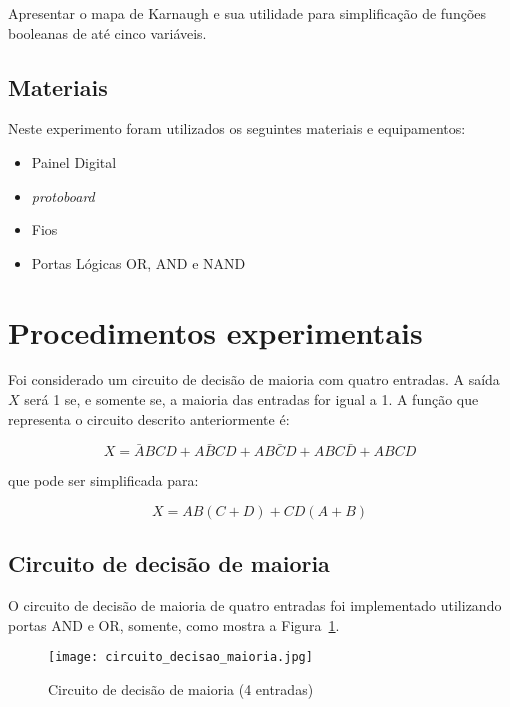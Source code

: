 \documentclass[12pt]{article}
\begin{document}
Apresentar o mapa de Karnaugh e sua utilidade para simplificação de funções booleanas de até cinco variáveis.

\subsection{Materiais} 
\label{sec:Materiais}
Neste experimento foram utilizados os seguintes materiais e equipamentos:
\begin{itemize}
    \item Painel Digital

    \item \textit{protoboard}
    
    \item Fios
    
    \item Portas Lógicas OR, AND e NAND
\end{itemize}

\section{Procedimentos experimentais}
\label{sec:Procedimentos}

Foi considerado um circuito de decisão de maioria com quatro entradas. A saída $X$ será 1 se, e somente se, a maioria das entradas for igual a 1. A função que representa o circuito descrito anteriormente é:

\begin{equation}
\label{eq:decisao_maioria}
    X = \bar{A}BCD + A\bar{B}CD + AB\bar{C}D + ABC\bar{D} + ABCD
\end{equation}

que pode ser simplificada para:

\begin{equation}
\label{eq:simp_decisao_maioria}
    X = AB(C + D) + CD(A + B)
\end{equation}

\subsection{Circuito de decisão de maioria}
\label{sec:CMaioria}

O circuito de decisão de maioria de quatro entradas foi implementado utilizando portas AND e OR, somente, como mostra a Figura~\ref{fig:circ_maioria}.

\begin{figure}[H]
    \centering
    \texttt{[image: circuito\_decisao\_maioria.jpg]}
    \caption{Circuito de decisão de maioria (4 entradas)}
    \label{fig:circ_maioria}
\end{figure}
\end{document}
